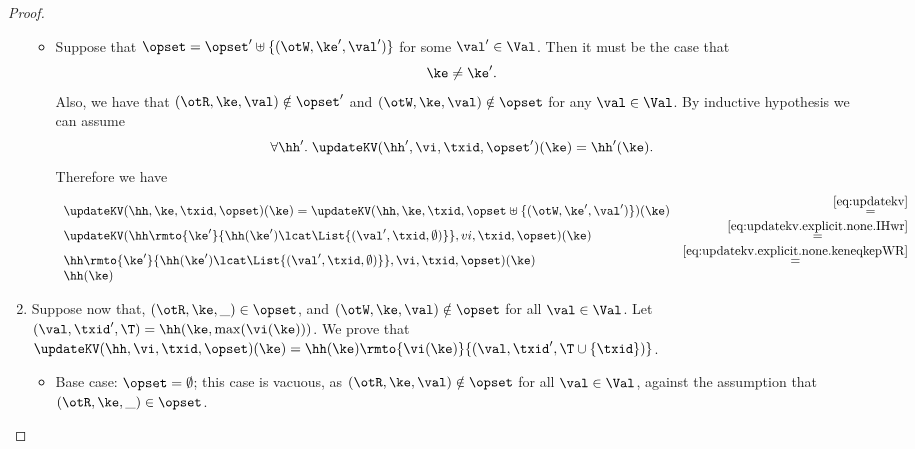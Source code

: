 \begin{proof}
\begin{enumerate}
\begin{itemize}
		\item Suppose that $\opset = \opset' \uplus \{(\otW, \ke', \val')\}$ for some $\val' \in \Val$. Then it must be the 
		case that 
		\begin{equation}
		\label{eq:updatekv.explicit.none.keneqkepWR}
		\ke \neq \ke'.
		\end{equation}
		Also, we have that $(\otR,\ke, \val) \notin \opset'$ and $(\otW, \ke, \val) \notin \opset$ for any $\val \in \Val$. 
		By inductive hypothesis we can assume 
		\begin{equation}
		\forall \hh'.\;\updateKV(\hh', \vi, \txid, \opset')(\ke) = \hh'(\ke).
		\label{eq:updatekv.explicit.none.IHwr}
		\end{equation}
		Therefore we have 
		\[
		\begin{array}{lr}
		\updateKV(\hh, \ke, \txid, \opset)(\ke) = \updateKV(\hh, \ke, \txid, \opset \uplus \{(\otW, \ke', \val')\})(\ke) &\stackrel{\eqref{eq:updatekv}}{=}\\
		\updateKV(\hh\rmto{\ke'}{\hh(\ke')\lcat \List{(\val', \txid, \emptyset)}}, vi, \txid,\opset)(\ke) &\stackrel{\eqref{eq:updatekv.explicit.none.IHwr}}{=}\\
		\hh\rmto{\ke'}{\hh(\ke') \lcat \List{(\val', \txid, \emptyset)}}, \vi, \txid, \opset)(\ke) & \stackrel{\eqref{eq:updatekv.explicit.none.keneqkepWR}}{=}\\
		\hh(\ke)
		\end{array}
		\]
	\end{itemize}

	\item Suppose now that, $(\otR, \ke, \_) \in \opset$, and $(\otW, \ke, \val) \notin \opset$ for all $\val \in \Val$. 
	Let $(\val, \txid', \T) = \hh(\ke, \max(\vi(\ke)))$. We prove that $\updateKV(\hh, \vi, \txid, \opset)(\ke) = 
	\hh(\ke)\rmto{\vi(\ke)}{(\val, \txid', \T \cup \{\txid\})}$.
		\begin{itemize}
		\item Base case: $\opset = \emptyset$; this case is vacuous, as $(\otR, \ke, \val) \notin \opset$ for all $\val \in \Val$, 
		against the assumption that $(\otR, \ke, \_) \in \opset$. 


\end{itemize}
\end{enumerate}
\end{proof}
